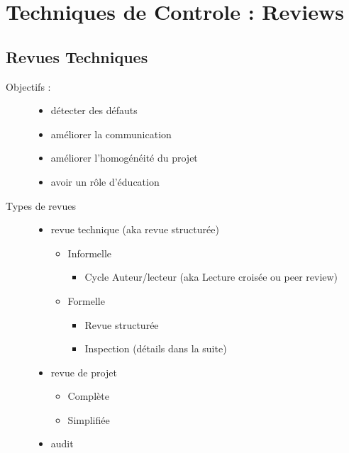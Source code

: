 \chapter{Techniques de Controle : Reviews}

\section{Revues Techniques}

\begin{description}
\item[Objectifs :]
	\begin{itemize}
	\item détecter des défauts
	\item améliorer la communication
	\item améliorer l'homogénéité du projet
	\item avoir un rôle d'éducation
	\end{itemize}

\item[Types de revues]
	\begin{itemize}

	\item revue technique (aka revue structurée)
		\begin{itemize}

		\item Informelle
			\begin{itemize}

			\item Cycle Auteur/lecteur (aka Lecture croisée ou peer review)
			\end{itemize}

		\item Formelle
			\begin{itemize}

				\item Revue structurée
				\item Inspection (détails dans la suite)

			\end{itemize}
		\end{itemize}

	\item revue de projet
		\begin{itemize}

		\item Complète
		\item Simplifiée

		\end{itemize}

	\item audit

	\end{itemize}

\end{description}


